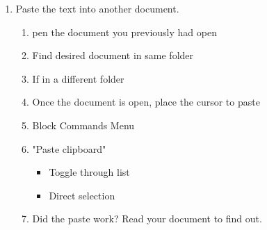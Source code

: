 \documentclass[10pt,letterpaper,twoside]{report}
\begin{document}
{\begin{enumerate}
\begin{enumerate}
\begin{enumerate}
\begin{itemize}
				                  \item Toggle through list 
				                  \item Direct selection 
			                  \end{itemize}
		            \end{enumerate}
		      \item Paste the text into another document.
		            \begin{enumerate}
			            \item pen the document you previously had open 
			            \item Find desired document in same folder  
			            \item If in a different folder 
			            \item Once the document is open, place the cursor to paste 
			            \item Block Commands Menu 
			            \item "Paste clipboard"
			                  \begin{itemize}
				                  \item Toggle through list 
				                  \item Direct selection 
			                  \end{itemize}
			            \item Did the paste work? Read your document to find out.
		            \end{enumerate}
	      \end{enumerate}
\end{enumerate}
\clearpage
}
\end{document}
